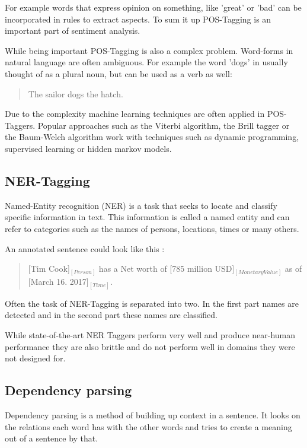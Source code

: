 \documentclass[10pt,a4paper]{article}
\begin{document}
		For example words that express opinion on something, like 'great' or 'bad' can be incorporated in rules to extract aspects. To sum it up POS-Tagging is an important part of sentiment analysis.
		
		While being important POS-Tagging is also a complex problem. Word-forms in natural language are often ambiguous. For example the word 'dogs' in usually thought of as a plural noun, but can be used as a verb as well:

		\begin{quote}
			The sailor dogs the hatch.
		\end{quote}

		Due to the complexity machine learning techniques are often applied in POS-Taggers. Popular approaches such as the Viterbi algorithm, the Brill tagger or the Baum-Welch algorithm work with techniques such as dynamic programming, supervised learning or hidden markov models.
		
		\subsection{NER-Tagging}
		
		Named-Entity recognition (NER) is a task that seeks to locate and classify specific information in text. This information is called a named entity and can refer to categories such as the names of persons, locations, times or many others.

		An annotated sentence could look like this :

		\begin{quote}
			[Tim Cook]$_{[Person]}$ has a Net worth of [785 million USD]$_{[Monetary Value]}$ as of [March 16. 2017]$_{[Time]}$.
		\end{quote}
		
		Often the task of NER-Tagging is separated into two. In the first part names are detected and in the second part these names are classified. 
		
		While state-of-the-art NER Taggers perform very well and produce near-human performance they are also brittle and do not perform well in domains they were not designed for.

		\subsection{Dependency parsing}
		
		Dependency parsing is a method of building up context in a sentence.
		It looks on the relations each word has with the other words and tries to create a meaning out of a sentence by that.
		
\end{document}

